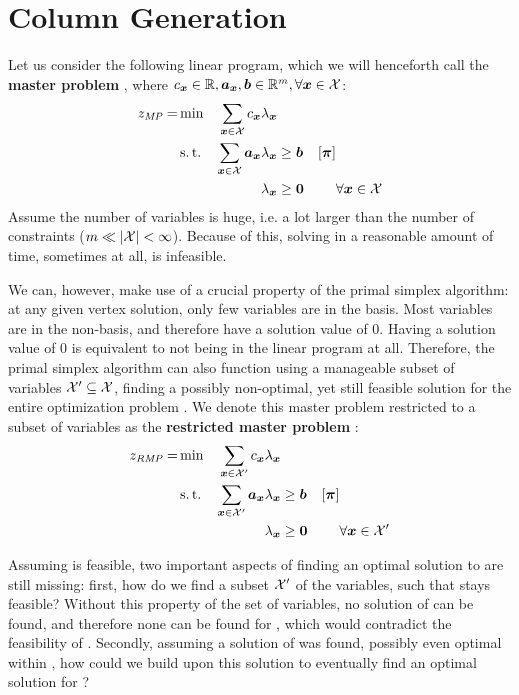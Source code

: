 \section{Column Generation}\label{sec:cg_bp_cg}
Let us consider the following linear program, which we will henceforth call the \textbf{master problem} \MP{}, where $c_{\bm{x}} \in \mathbb{R}, {\bm{a}}_{\bm{x}}, {\bm{b}} \in \mathbb{R}^m, \forall {\bm{x}} \in \mathcal{X}$:
\begin{equation}
\begin{aligned}
z_{\textit{MP}}{} = &\min & \sum_{{\bm{x}} \in \mathcal{X}} c_{\bm{x}} \lambda_{\bm{x}} & & & \\
&\operatorname{s.t.} & \sum_{{\bm{x}} \in \mathcal{X}} {\bm{a}}_{\bm{x}} \lambda_{\bm{x}} & \geq {\bm{b}} & \left[{\bm{\pi}}\right] & \\
&& \lambda_{\bm{x}} & \geq {\bm{0}} & & \forall {\bm{x}} \in \mathcal{X}
\end{aligned}
\end{equation}
Assume the number of variables is huge, i.e. a lot larger than the number of constraints ($m \ll \lvert\mathcal{X}\rvert < \infty$). Because of this, solving \MP{} in a reasonable amount of time, sometimes at all, is infeasible.

We can, however, make use of a crucial property of the primal simplex algorithm: at any given vertex solution, only few variables are in the basis. Most variables are in the non-basis, and therefore have a solution value of $0$. Having a solution value of $0$ is equivalent to not being in the linear program at all. Therefore, the primal simplex algorithm can also function using a manageable subset of variables $\mathcal{X}' \subseteq \mathcal{X}$, finding a possibly non-optimal, yet still feasible solution for the entire optimization problem \MP{}. We denote this master problem restricted to a subset of variables as the \textbf{restricted master problem} \RMP{}:
\begin{equation}
\begin{aligned}
z_{\textit{RMP}}{} = &\min & \sum_{{\bm{x}} \in \mathcal{X}'} c_{\bm{x}} \lambda_{\bm{x}} & & & \\
&\operatorname{s.t.} & \sum_{{\bm{x}} \in \mathcal{X}'} {\bm{a}}_{\bm{x}} \lambda_{\bm{x}} & \geq {\bm{b}} & \left[{\bm{\pi}}\right] & \\
&& \lambda_{\bm{x}} & \geq {\bm{0}} & & \forall {\bm{x}} \in \mathcal{X}'
\end{aligned}
\end{equation}

Assuming \MP{} is feasible, two important aspects of finding an optimal solution to \MP{} are still missing: first, how do we find a subset $\mathcal{X}'$ of the variables, such that \RMP{} stays feasible? Without this property of the set of variables, no solution of \RMP{} can be found, and therefore none can be found for \MP{}, which would contradict the feasibility of \MP{}. Secondly, assuming a solution of \RMP{} was found, possibly even optimal within \RMP{}, how could we build upon this solution to eventually find an optimal solution for \MP{}?

